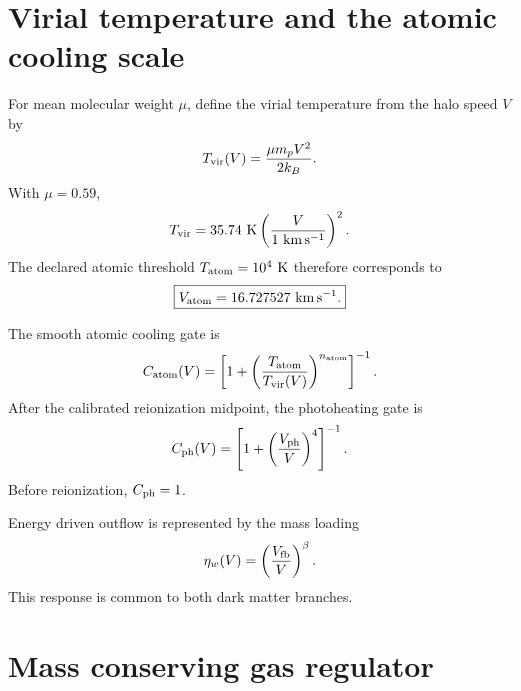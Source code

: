 \section{Virial temperature and the atomic cooling scale}

For mean molecular weight $\mu$, define the virial temperature from the halo speed $V$ by
\begin{equation}
T_{\rm vir}(V)
=
\frac{\mu m_pV^2}{2k_B}.
\label{eq:cfr-virial-temperature}
\end{equation}
With $\mu=0.59$,
\begin{equation}
T_{\rm vir}
=
35.74\ {\rm K}
\left(\frac{V}{1\ {\rm km\,s^{-1}}}\right)^2.
\label{eq:cfr-temperature-speed}
\end{equation}
The declared atomic threshold $T_{\rm atom}=10^4\ {\rm K}$ therefore corresponds to
\begin{equation}
\boxed{
V_{\rm atom}=16.727527\ {\rm km\,s^{-1}}.
}
\label{eq:cfr-atomic-speed}
\end{equation}

The smooth atomic cooling gate is
\begin{equation}
C_{\rm atom}(V)
=
\left[
1+
\left(
\frac{T_{\rm atom}}{T_{\rm vir}(V)}
\right)^{n_{\rm atom}}
\right]^{-1}.
\label{eq:cfr-atomic-gate}
\end{equation}
After the calibrated reionization midpoint, the photoheating gate is
\begin{equation}
C_{\rm ph}(V)
=
\left[
1+
\left(
\frac{V_{\rm ph}}{V}
\right)^4
\right]^{-1}.
\label{eq:cfr-photo-gate}
\end{equation}
Before reionization, $C_{\rm ph}=1$.

Energy driven outflow is represented by the mass loading
\begin{equation}
\eta_w(V)
=
\left(
\frac{V_{\rm fb}}{V}
\right)^\beta.
\label{eq:cfr-mass-loading}
\end{equation}
This response is common to both dark matter branches.

\section{Mass conserving gas regulator}

